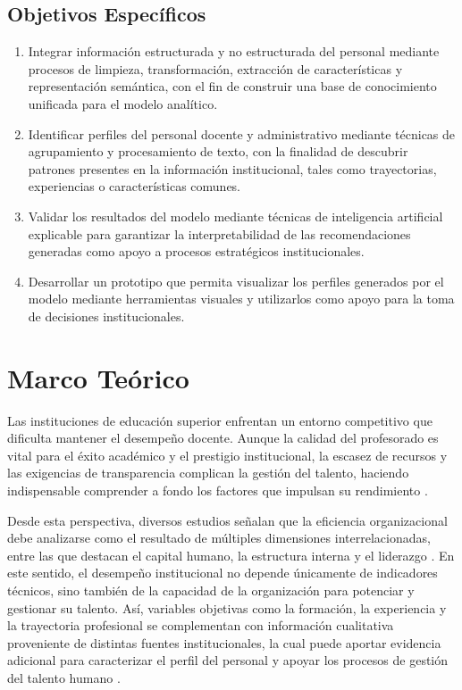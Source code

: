         \subsection{Objetivos Específicos}
            \begin{enumerate}
                \item Integrar información estructurada y no estructurada del personal mediante procesos de limpieza, transformación, extracción de características y representación semántica, con el fin de construir una base de conocimiento unificada para el modelo analítico. 
                \item Identificar perfiles del personal docente y administrativo mediante técnicas de agrupamiento y procesamiento de texto, con la finalidad de descubrir patrones presentes en la información institucional, tales como trayectorias, experiencias o características comunes. 
                \item Validar los resultados del modelo mediante técnicas de inteligencia artificial explicable para garantizar la interpretabilidad de las recomendaciones generadas como apoyo a procesos estratégicos institucionales.
                \item Desarrollar un prototipo que permita visualizar los perfiles generados por el modelo mediante herramientas visuales y utilizarlos como apoyo para la toma de decisiones institucionales. 
            \end{enumerate}
            
    \section{Marco Teórico}
        Las instituciones de educación superior enfrentan un entorno competitivo que dificulta mantener el desempeño docente. Aunque la calidad del profesorado es vital para el éxito académico y el prestigio institucional, la escasez de recursos y las exigencias de transparencia complican la gestión del talento, haciendo indispensable comprender a fondo los factores que impulsan su rendimiento \parencite{He2026}.

        Desde esta perspectiva, diversos estudios señalan que la eficiencia organizacional debe analizarse como el resultado de múltiples dimensiones interrelacionadas, entre las que destacan el capital humano, la estructura interna y el liderazgo \parencite{Minbaeva2018,Zhu2018}. En este sentido, el desempeño institucional no depende únicamente de indicadores técnicos, sino también de la capacidad de la organización para potenciar y gestionar su talento. Así, variables objetivas como la formación, la experiencia y la trayectoria profesional se complementan con información cualitativa proveniente de distintas fuentes institucionales, la cual puede aportar evidencia adicional para caracterizar el perfil del personal y apoyar los procesos de gestión del talento humano \parencite{Fegade2023}.

